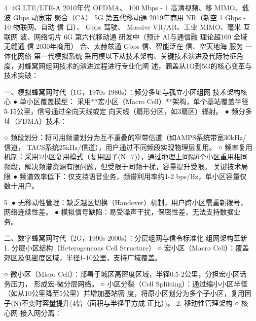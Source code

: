                                                                    4
4G        LTE/LTE-A   2010年代
                          OFDMA、    100 Mbps - 1 高清视频、移
                          MIMO、载波   Gbps         动宽带
                          聚合（CA）
5G        第五代移动通 2019年商用 NR（新空      1 Gbps - 10   物联网、自动
          信               口）、       Gbps          驾驶、
                          Massive                 VR/AR、工业
                          MIMO、毫米                 互联网
                          波、网络切片
6G        第六代移动通 研发中（预计 AI与通信融      理论超100        全域无缝通
          信      2030年商用） 合、太赫兹通    Gbps          信、智能泛在
                          信、空天地海                  服务
                          一体化网络
第一代模拟系统
采用模以下从技术架构、关键技术演进及代际特征角度，对蜂窝网组网技术的演进过程进行专业化阐
述，涵盖从1G到5G的核心变革与技术突破：


一、模拟蜂窝网时代（1G，1970s-1980s）：频分多址与孤立小区组网
技术架构核心
●   单小区覆盖模型：
  采用**宏小区（Macro Cell）**架构，单个基站覆盖半径5-15公里，信号通过全向天线或定
  向天线（扇形分区，如3扇区）辐射。
● 频分多址（FDMA）技术：

   ○ 频段划分：将可用频谱划分为互不重叠的窄带信道（如AMPS系统带宽30kHz/信道，
     TACS系统25kHz/信道），用户通过不同频段实现物理层复用。
   ○ 频率复用机制：采用7小区复用模式（复用因子(N=7)），通过地理上间隔6个小区重用相同
     频段，解决频谱资源有限问题，但受限于同频干扰，容量提升受限。
关键技术局限
●   频谱效率低下：仅支持语音业务，频谱利用率约1-2 bps/Hz，单小区容量仅数十用户。

                                                             5
● 无移动性管理：缺乏越区切换（Handover）机制，用户跨小区需重新拨号，网络连续性差。
● 模拟信号缺陷：易受噪声干扰，保密性差，无法支持数据业务。




二、数字蜂窝网时代（2G，1990s-2000s）：分层组网与信令标准化
组网架构革新
1.   分层小区结构（Heterogeneous Cell Structure）
      ○ 宏小区（Macro Cell）：覆盖郊区及低密度区域，半径1-10公里，支持广域覆盖。

      ○ 微小区（Micro Cell）：部署于城区高密度区域，半径0.5-2公里，分担宏小区话务压力，
        形成宏-微分层网络。
      ○ 小区分裂（Cell Splitting）：通过缩小小区半径（如从10公里降至5公里）并增加基站密
       度，将原小区划分为多个子小区，复用因子(N)不变时容量提升(4倍（面积与半径平方成
       正比）)。
2.   移动性管理架构
      ○ 核心网-接入网分离：

